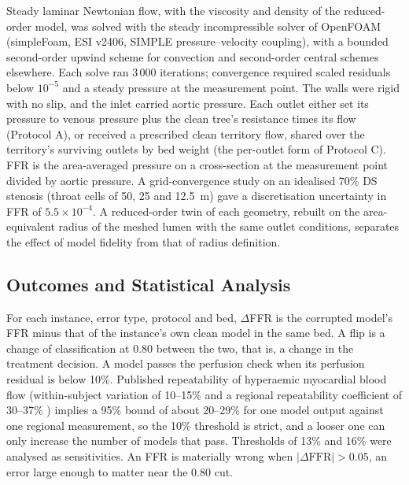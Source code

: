 \documentclass[journal]{IEEEtran}
\begin{document}
Steady laminar Newtonian flow, with the viscosity and density of the reduced-order model, was solved with the
steady incompressible solver of OpenFOAM (simpleFoam, ESI v2406, SIMPLE pressure--velocity coupling), with a
bounded second-order upwind scheme for convection and second-order central schemes elsewhere. Each solve ran
3\,000 iterations; convergence required scaled residuals below $10^{-5}$ and a steady pressure at the measurement
point. The walls were rigid with no slip, and the inlet carried aortic pressure. Each outlet either set its pressure
to venous pressure plus the clean tree's resistance times its flow (Protocol A), or received a prescribed clean
territory flow, shared over the territory's surviving outlets by bed weight (the per-outlet form of Protocol C). FFR
is the area-averaged pressure on a cross-section at the measurement point divided by aortic pressure. A
grid-convergence study on an idealised 70\% DS stenosis (throat cells of 50, 25 and 12.5~\textmu m) gave a
discretisation uncertainty in FFR of $5.5\times10^{-4}$. A reduced-order twin of each geometry, rebuilt on the
area-equivalent radius of the meshed lumen with the same outlet conditions, separates the effect of model fidelity
from that of radius definition.

\subsection{Outcomes and Statistical Analysis}
For each instance, error type, protocol and bed, $\Delta$FFR is the corrupted model's FFR minus that of the
instance's own clean model in the same bed. A flip is a change of classification at 0.80 between the two, that is,
a change in the treatment decision. A model passes the perfusion check when its perfusion residual is below 10\%.
Published repeatability of hyperaemic myocardial blood flow (within-subject variation of 10--15\%
\cite{schindler2023} and a regional repeatability coefficient of 30--37\% \cite{brown2018}) implies a 95\% bound of
about 20--29\% for one model output against one regional measurement, so the 10\% threshold is strict, and a looser
one can only increase the number of models that pass. Thresholds of 13\% and 16\% were analysed as
sensitivities. An FFR is materially wrong when $|\Delta\mathrm{FFR}| > 0.05$, an error large enough to matter near
the 0.80 cut.
\end{document}
